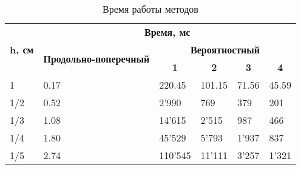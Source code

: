 \documentclass[12pt, a4paper]{article}
\begin{document}
\begin{table}[H]
	\small
	\caption{Время работы методов}
	\label{tbl:time}
	\begin{tabular}{|l|lllll|}
		\hline
		\multicolumn{1}{|c|}{\multirow{3}{*}{\textbf{h, см}}} & \multicolumn{5}{c|}{\textbf{Время, мс}}                                                                                                                                                                     \\ \cline{2-6}
		\multicolumn{1}{|c|}{}                                & \multicolumn{1}{c|}{\multirow{2}{*}{\textbf{Продольно-поперечный}}} & \multicolumn{4}{c|}{\textbf{Вероятностный}}                                                                                           \\ \cline{3-6}
		\multicolumn{1}{|c|}{}                                & \multicolumn{1}{c|}{}                                               & \multicolumn{1}{c|}{\textbf{1}} & \multicolumn{1}{c|}{\textbf{2}} & \multicolumn{1}{c|}{\textbf{3}} & \multicolumn{1}{c|}{\textbf{4}} \\ \hline
		1                                                     & \multicolumn{1}{l|}{0.17}                                           & \multicolumn{1}{l|}{220.45}     & \multicolumn{1}{l|}{101.15}     & \multicolumn{1}{l|}{71.56}      & 45.59                           \\ \hline
		1/2                                                   & \multicolumn{1}{l|}{0.52}                                           & \multicolumn{1}{l|}{2'990}      & \multicolumn{1}{l|}{769}        & \multicolumn{1}{l|}{379}        & 201                             \\ \hline
		1/3                                                   & \multicolumn{1}{l|}{1.08}                                           & \multicolumn{1}{l|}{14'615}     & \multicolumn{1}{l|}{2'515}      & \multicolumn{1}{l|}{987}        & 466                             \\ \hline
		1/4                                                   & \multicolumn{1}{l|}{1.80}                                           & \multicolumn{1}{l|}{45'529}     & \multicolumn{1}{l|}{5'793}      & \multicolumn{1}{l|}{1'937}      & 837                             \\ \hline
		1/5                                                   & \multicolumn{1}{l|}{2.74}                                           & \multicolumn{1}{l|}{110'545}    & \multicolumn{1}{l|}{11'111}     & \multicolumn{1}{l|}{3'257}      & 1'321                           \\ \hline

\end{tabular}
\end{table}
\end{document}

